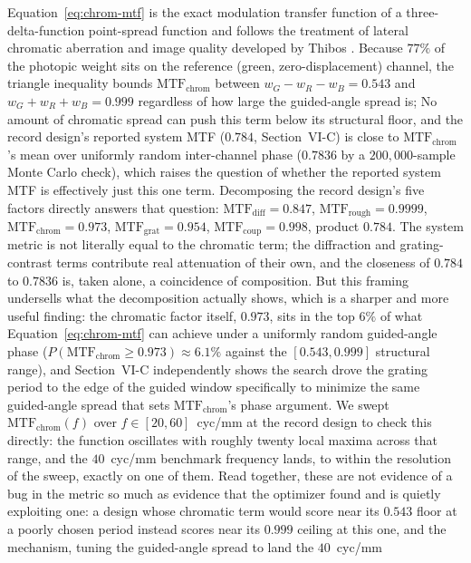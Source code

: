 \documentclass[10pt,twocolumn]{article}
\begin{document}
Equation~\eqref{eq:chrom-mtf} is the exact modulation transfer function of
a three-delta-function point-spread function and follows the treatment of
lateral chromatic aberration and image quality developed by Thibos
\cite{thibos1987}. Because $77\%$ of the photopic weight sits on the
reference (green, zero-displacement) channel, the triangle inequality
bounds $\mathrm{MTF}_{\mathrm{chrom}}$ between $w_G-w_R-w_B=0.543$ and
$w_G+w_R+w_B=0.999$ regardless of how large the guided-angle spread is;
No amount of chromatic spread can push this term below its structural
floor, and the record design's reported system MTF ($0.784$,
Section~VI-C) is close to $\mathrm{MTF}_{\mathrm{chrom}}$'s mean over
uniformly random inter-channel phase ($0.7836$ by a $200{,}000$-sample
Monte Carlo check), which raises the question of whether the reported
system MTF is effectively just this one term. Decomposing the record
design's five factors directly answers that question: $\mathrm{MTF}_{\mathrm{diff}}=0.847$,
$\mathrm{MTF}_{\mathrm{rough}}=0.9999$, $\mathrm{MTF}_{\mathrm{chrom}}=0.973$,
$\mathrm{MTF}_{\mathrm{grat}}=0.954$, $\mathrm{MTF}_{\mathrm{coup}}=0.998$,
product $0.784$. The system metric is not literally equal to the
chromatic term; the diffraction and grating-contrast terms contribute
real attenuation of their own, and the closeness of $0.784$ to
$0.7836$ is, taken alone, a coincidence of composition. But this framing
undersells what the decomposition actually shows, which is a sharper and
more useful finding: the chromatic factor itself, $0.973$, sits in the
top $6\%$ of what Equation~\eqref{eq:chrom-mtf} can achieve under a
uniformly random guided-angle phase ($P(\mathrm{MTF}_{\mathrm{chrom}}\geq0.973)\approx6.1\%$
against the $[0.543,0.999]$ structural range), and Section~VI-C
independently shows the search drove the grating period to the edge of
the guided window specifically to minimize the same guided-angle spread
that sets $\mathrm{MTF}_{\mathrm{chrom}}$'s phase argument. We swept
$\mathrm{MTF}_{\mathrm{chrom}}(f)$ over $f\in[20,60]$~cyc/mm at the record
design to check this directly: the function oscillates with roughly
twenty local maxima across that range, and the $40$~cyc/mm benchmark
frequency lands, to within the resolution of the sweep, exactly on one of
them. Read together, these are not evidence of a bug in the metric so
much as evidence that the optimizer found and is quietly exploiting one:
a design whose chromatic term would score near its $0.543$ floor at a
poorly chosen period instead scores near its $0.999$ ceiling at this one,
and the mechanism, tuning the guided-angle spread to land the $40$~cyc/mm
\end{document}
